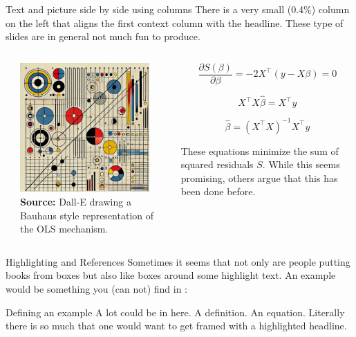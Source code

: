 \documentclass[11pt, aspectratio=169, t]{beamer}
\begin{document}
\begin{frame}{Text and picture side by side using columns}
\protect\hypertarget{text-and-picture-side-by-side-using-columns}{}
There is a very small (0.4\%) column on the left that aligns the first
context column with the headline. These type of slides are in general
not much fun to produce.

\begin{columns}[T]
\begin{column}{0.004\textwidth}
\end{column}

\begin{column}{0.446\textwidth}
\includegraphics[width=\textwidth,height=1.94444in]{pictures/OLSpic.png}
\scriptsize\textbf{Source:} Dall-E drawing a Bauhaus style
representation of the OLS mechanism.
\end{column}

\begin{column}{0.55\textwidth}
\begin{equation}
\frac{\partial S(\beta)}{\partial \beta} = -2X^\top (y - X\beta) = 0
\end{equation}

\begin{equation}
X^\top X \hat{\beta} = X^\top y
\end{equation}

\begin{equation}
\hat{\beta} = (X^\top X)^{-1} X^\top y
\end{equation}

These equations minimize the sum of squared residuals \(S\). While this
seems promising, others argue that this has been done before.
\end{column}
\end{columns}
\end{frame}

\begin{frame}{Highlighting and References}
\protect\hypertarget{highlighting-and-references}{}
Sometimes it seems that not only are people putting books from boxes but
also like boxes around some highlight text. An example would be
something you (can not) find in \textcite{stern2022}:

\begin{exampleblock}{Defining an example}
A lot could be in here. A definition. An equation. Literally there is so much that one would want to get framed with a highlighted headline. 
\end{exampleblock}
\end{frame}
\end{document}
